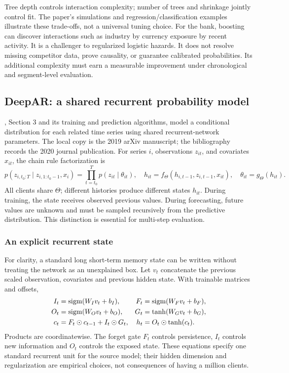 Tree depth controls interaction complexity; number of trees and shrinkage jointly control fit. The paper's simulations and regression/classification examples illustrate these trade-offs, not a universal tuning choice. For the bank, boosting can discover interactions such as industry by currency exposure by recent activity. It is a challenger to regularized logistic hazards. It does not resolve missing competitor data, prove causality, or guarantee calibrated probabilities. Its additional complexity must earn a measurable improvement under chronological and segment-level evaluation.

\subsection{DeepAR: a shared recurrent probability model}

\citet{salinas2020deepar}, Section 3 and its training and prediction algorithms, model a conditional distribution for each related time series using shared recurrent-network parameters. The local copy is the 2019 arXiv manuscript; the bibliography records the 2020 journal publication. For series $i$, observations $z_{it}$, and covariates $x_{it}$, the chain rule factorization is
\begin{equation}
 p(z_{i,t_0:T}\mid z_{i,1:t_0-1},x_i)
 =\prod_{t=t_0}^{T}p(z_{it}\mid\theta_{it}),\quad
 h_{it}=f_\Theta(h_{i,t-1},z_{i,t-1},x_{it}),\quad
 \theta_{it}=g_\Theta(h_{it}).
 \label{eq:deepar}
\end{equation}
All clients share $\Theta$; different histories produce different states $h_{it}$. During training, the state receives observed previous values. During forecasting, future values are unknown and must be sampled recursively from the predictive distribution. This distinction is essential for multi-step evaluation.

\subsubsection{An explicit recurrent state}

For clarity, a standard long short-term memory state can be written without treating the network as an unexplained box. Let $v_t$ concatenate the previous scaled observation, covariates and previous hidden state. With trainable matrices and offsets,
\begin{align*}
 I_t&=\operatorname{sigm}(W_Iv_t+b_I),& F_t&=\operatorname{sigm}(W_Fv_t+b_F),\\
 O_t&=\operatorname{sigm}(W_Ov_t+b_O),& G_t&=\tanh(W_Gv_t+b_G),\\
 c_t&=F_t\odot c_{t-1}+I_t\odot G_t,&h_t&=O_t\odot\tanh(c_t).
\end{align*}
Products are coordinatewise. The forget gate $F_t$ controls persistence, $I_t$ controls new information and $O_t$ controls the exposed state. These equations specify one standard recurrent unit for the source model; their hidden dimension and regularization are empirical choices, not consequences of having a million clients.

